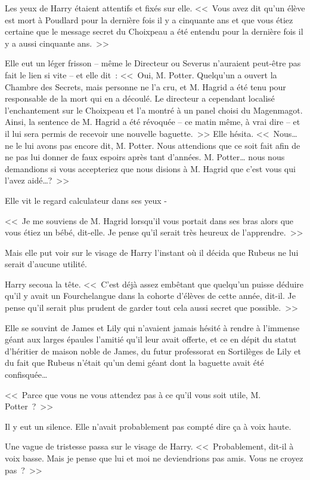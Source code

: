 Les yeux de Harry étaient attentifs et fixés sur elle. <<~Vous avez dit qu'un élève est mort à Poudlard pour la dernière fois il y a cinquante ans et que vous étiez certaine que le message secret du Choixpeau a été entendu pour la dernière fois il y a aussi cinquante ans.~>>

Elle eut un léger frisson -- même le Directeur ou Severus n'auraient peut-être pas fait le lien si vite -- et elle dit~: <<~Oui, M. Potter. Quelqu'un a ouvert la Chambre des Secrets, mais personne ne l'a cru, et M. Hagrid a été tenu pour responsable de la mort qui en a découlé. Le directeur a cependant localisé l'enchantement sur le Choixpeau et l'a montré à un panel choisi du Magenmagot. Ainsi, la sentence de M. Hagrid a été révoquée -- ce matin même, à vrai dire -- et il lui sera permis de recevoir une nouvelle baguette.~>> Elle hésita. <<~Nous… ne le lui avons pas encore dit, M. Potter. Nous attendions que ce soit fait afin de ne pas lui donner de faux espoirs après tant d'années. M. Potter… nous nous demandions si vous accepteriez que nous disions à M. Hagrid que c'est vous qui l'avez aidé…?~>>

Elle vit le regard calculateur dans ses yeux -

<<~Je me souviens de M. Hagrid lorsqu'il vous portait dans ses bras alors que vous étiez un bébé, dit-elle. Je pense qu'il serait très heureux de l'apprendre.~>>

Mais elle put voir sur le visage de Harry l'instant où il décida que Rubeus ne lui serait d'aucune utilité.

Harry secoua la tête. <<~C'est déjà assez embêtant que quelqu'un puisse déduire qu'il y avait un Fourchelangue dans la cohorte d'élèves de cette année, dit-il. Je pense qu'il serait plus prudent de garder tout cela aussi secret que possible.~>>

Elle se souvint de James et Lily qui n'avaient jamais hésité à rendre à l'immense géant aux larges épaules l'amitié qu'il leur avait offerte, et ce en dépit du statut d'héritier de maison noble de James, du futur professorat en Sortilèges de Lily et du fait que Rubeus n'était qu'un demi géant dont la baguette avait été confisquée…

<<~Parce que vous ne vous attendez pas à ce qu'il vous soit utile, M. Potter~?~>>

Il y eut un silence. Elle n'avait probablement pas compté dire ça à voix haute.

Une vague de tristesse passa sur le visage de Harry. <<~Probablement, dit-il à voix basse. Mais je pense que lui et moi ne deviendrions pas amis. Vous ne croyez pas~?~>>

